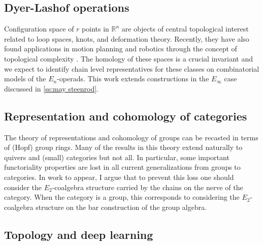 \subsection{Dyer-Lashof operations}

Configuration space of $r$ points in $\mathbb R^n$ are objects of central topological interest related to loop spaces, knots, and deformation theory.
Recently, they have also found applications in motion planning and robotics through the concept of topological complexity \cite{farber2003motion.planning}.
The homology of these spaces is a crucial invariant and we expect to identify chain level representatives for these classes on combinatorial models of the $E_n$-operads.
This work extends constructions in the $E_\infty$ case discussed in \cref{ss:may steenrod}.

\subsection{Representation and cohomology of categories}

The theory of representations and cohomology of groups can be recasted in terms of (Hopf) group rings.
Many of the results in this theory extend naturally to quivers and (small) categories but not all.
In particular, some important functoriality properties are lost in all current generalizations from groups to categories.
In work to appear, I argue that to prevent this loss one should consider the $E_2$-coalgebra structure carried by the chains on the nerve of the category.
When the category is a group, this corresponds to considering the $E_2$-coalgebra structure on the bar construction of the group algebra.

\subsection{Topology and deep learning}

